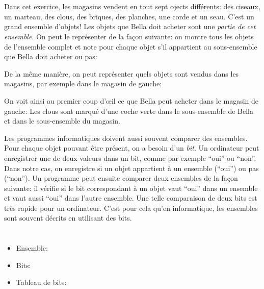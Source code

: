 {{%
\section*{\BrochureItsInformatics}
Dans cet exercice, les magasins vendent en tout sept ojects différents: des ciseaux, un marteau, des clous, des briques, des planches, une corde et un seau. C’est un grand ensemble d’objets! Les objets que Bella doit acheter sont une \emph{partie de cet ensemble}. On peut le représenter de la façon suivante: on montre tous les objets de l’ensemble complet et note pour chaque objet s’il appartient au sous-ensemble que Bella doit acheter ou pas:

{\centering%
\par}

De la même manière, on peut représenter quels objets sont vendus dans les magasins, par exemple dans le magasin de gauche:

{\centering%
\par}

On voit ainsi au premier coup d’œil ce que Bella peut acheter dans le magasin de gauche: Les clous sont marqué d’une coche verte dans le sous-ensemble de Bella et dans le sous-ensemble du magasin.

Les programmes informatiques doivent aussi souvent comparer des ensembles. Pour chaque objet pouvant être présent, on a besoin d’un \emph{bit}. Un ordinateur peut enregistrer une de deux valeurs dans un bit, comme par exemple “oui” ou “non”. Dans notre cas, on enregistre si un objet appartient à un ensemble (“oui”) ou pas (“non”). Un programme peut ensuite comparer deux ensembles de la façon suivante: il vérifie si le bit correspondant à un objet vaut “oui” dans un ensemble et vaut aussi “oui” dans l’autre ensemble. Une telle comparaison de deux bits est très rapide pour un ordinateur. C’est pour cela qu’en informatique, les ensembles sont souvent décrits en utilisant des bits.



\section*{\BrochureWebsitesAndKeywords}
{\raggedright
\begin{itemize}
  \item Ensemble: \href{https://fr.wikipedia.org/wiki/Ensemble_(informatique)}{}
  \item Bits: \href{https://fr.wikipedia.org/wiki/Bit}{}
  \item Tableau de bits: \href{https://fr.wikipedia.org/wiki/Tableau_de_bits}{}
\end{itemize}


}}}
